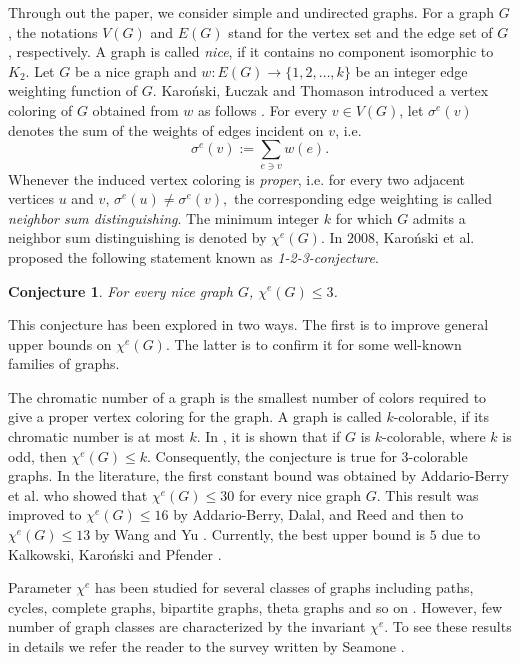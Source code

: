 \documentclass[12pt,a4paper]{article}
\newtheorem{conjecture}{\bf Conjecture}
\begin{document}
Through out the paper,  we consider  simple and undirected graphs. For a graph $G$, the notations $V(G)$ and $E(G)$ stand for the vertex set and the edge set of  $G$, respectively.  A graph is called \textit{nice}, if it contains no component isomorphic to $ K_2 $.
Let $ G $ be a nice graph and $ w:E(G)\rightarrow\{1,2,\ldots, k\} $ be an integer edge weighting function of $G$.
Karo\'nski,  \L uczak and Thomason introduced a vertex coloring of $ G $ obtained from $w$ as follows \cite{KLT}.
For every $ v\in V(G) $, let $ \sigma^{e}(v) $ denotes the  sum of the  weights of edges incident on $ v $, i.e.
\begin{equation*}
\sigma^{e}(v) :=\sum_{e\ni v}w(e).
\end{equation*}
Whenever  the induced vertex coloring is \textit{proper}, i.e. for every two adjacent vertices $ u $ and $ v $, $ \sigma^{e}(u)\neq\sigma^{e}(v), $ the corresponding edge weighting is called \textit{neighbor sum distinguishing}.
The minimum integer $ k $ for which $ G $ admits a neighbor sum distinguishing is denoted by $ \chi^{e}(G) $.
In $ 2008 $, Karo\'nski et al. proposed the following statement  known as \textit{1-2-3-conjecture}.
\begin{conjecture}\label{conj:123}{\em\cite{KLT}}
	For every nice graph $ G $, $  \chi^{e}(G)\leq 3 $.
\end{conjecture}


This conjecture  has been explored in two ways. The first is to improve general upper bounds on $ \chi^{e}(G) $. The latter is to confirm it for some well-known families of graphs.

The chromatic number of a graph is the smallest number of colors required to give a proper vertex coloring for the graph.
A graph is called $ k $-colorable, if its chromatic number is at most $ k $.
In \cite{KLT}, it is  shown that if $G$ is  $ k $-colorable,
where $k$ is odd, then $ \chi^{e}(G) \leq k$. Consequently, the conjecture is true for
$3$-colorable graphs. In the literature, the first  constant bound was obtained by
Addario-Berry et al. \cite{A2} who showed that $ \chi^{e}(G) \leq 30$ for every nice graph $ G $. This result was improved to $ \chi^{e}(G) \leq 16$ by Addario-Berry, Dalal, and Reed \cite{A1} and then to  $ \chi^{e}(G) \leq 13$ by Wang
and Yu \cite{WY}. Currently, the best upper bound is $5$ due to  Kalkowski,  Karo\'nski and  Pfender  \cite{KKP}.

Parameter $  \chi^{e}$ has been studied for several classes of graphs
including paths, cycles,  complete graphs,  bipartite graphs, theta graphs and so on \cite{CH, DO, LYZ}.  However,   few number of graph classes are characterized  by the invariant $  \chi^{e}$.
To see these results in details we refer the reader to the survey written by Seamone \cite{survey}.
\end{document}
